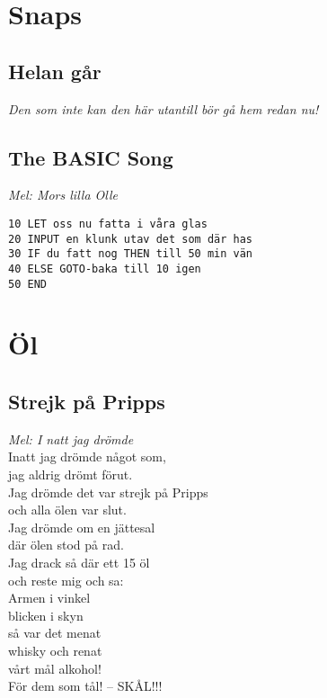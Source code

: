 \documentclass[twoside, openright]{report}
\begin{document}
\chapter{Snaps}
\section{Helan går}
\textit{Den som inte kan den här utantill bör gå hem redan nu!}

\section{The BASIC Song}
\textit{Mel: Mors lilla Olle}
\begin{lstlisting}[caption=song.bas]
10 LET oss nu fatta i våra glas
20 INPUT en klunk utav det som där has
30 IF du fatt nog THEN till 50 min vän
40 ELSE GOTO-baka till 10 igen
50 END
\end{lstlisting}

\chapter{Öl}

\section{Strejk på Pripps}
\textit{Mel: I natt jag drömde}\\

Inatt jag drömde något som,\\
jag aldrig drömt förut.\\
Jag drömde det var strejk på Pripps\\
och alla ölen var slut.\\
Jag drömde om en jättesal\\
där ölen stod på rad.\\
Jag drack så där ett 15 öl\\
och reste mig och sa:\\
Armen i vinkel\\
blicken i skyn\\
så var det menat\\
whisky och renat\\
vårt mål alkohol!\\
För dem som tål! -- SKÅL!!!\\
\end{document}
